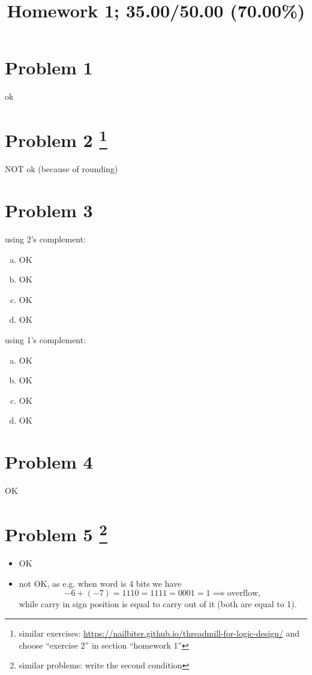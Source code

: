 \documentclass[10pt]{article} %
\title{Homework 1;
 35.00/50.00 (70.00\%)
}
\begin{document}
\maketitle

\section*{Problem 1 }
ok
\section*{Problem 2  \footnote{similar exercises: \url{https://nailbiter.github.io/threadmill-for-logic-design/} and choose ``exercise 2'' in section ``homework 1''}}
NOT ok (because of rounding)
\section*{Problem 3 }
using 2's complement:
\begin{enumerate}[(a)]
  \item OK
  \item OK
  \item OK
  \item OK
\end{enumerate}
using 1's complement:
\begin{enumerate}[(a)]
  \item OK
  \item OK
  \item OK
  \item OK
\end{enumerate}
\section*{Problem 4 }
OK
\section*{Problem 5  \footnote{similar problems: write the second condition}}
\begin{itemize}
  \item OK
  \item not OK, as e.g. when word is 4 bits we have \begin{equation*}
      -6+(-7)=1110=1111=0001=1 \implies\mbox{overflow},
    \end{equation*}
    while carry in sign position is equal to carry out of it (both are equal to 1).
\end{itemize}
\end{document}

